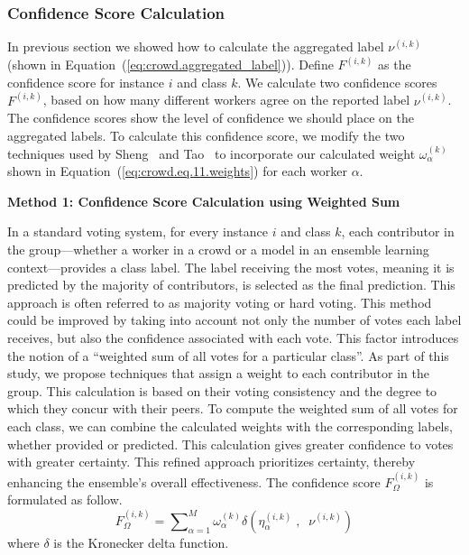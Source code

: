 \documentclass[default]{bst/sn-jnl_mine}%
\newenvironment{mymdframed}[1]{
	\begin{framed}
        \begin{center}
        \textbf{#1} \\
        \end{center}
        }
{\end{framed}}
\begin{document}
\subsubsection{Confidence Score Calculation}
In previous section we showed how to calculate the aggregated label $\nu^{(i,k)}$ (shown in Equation~(\ref{eq:crowd.aggregated_label})). Define $F^{(i,k)} $ as the confidence score for instance $i $ and class $k $. We calculate two confidence scores $F^{(i,k)} $, based on how many different workers agree on the reported label $\nu^{(i,k)}$. The confidence scores show the level of confidence we should place on the aggregated labels. To calculate this confidence score, we modify the two techniques used by Sheng~\cite{sheng_Majority_2019} and Tao~\cite{tao_Label_2020} to incorporate our calculated weight $\omega_{\alpha}^{(k)} $ shown in Equation~(\ref{eq:crowd.eq.11.weights})  for each worker $\alpha $.
\begin{mymdframed}{Method 1: Confidence Score Calculation using Weighted Sum}
    In a standard voting system, for every instance $i$ and class $k$, each contributor in the group—whether a worker in a crowd or a model in an ensemble learning context—provides a class label. The label receiving the most votes, meaning it is predicted by the majority of contributors, is selected as the final prediction. This approach is often referred to as majority voting or hard voting.
    This method could be improved by taking into account not only the number of votes each label receives, but also the confidence associated with each vote. This factor introduces the notion of a ``weighted sum of all votes for a particular class''. As part of this study, we propose techniques that assign a weight to each contributor in the group. This calculation is based on their voting consistency and the degree to which they concur with their peers.
    To compute the weighted sum of all votes for each class, we can combine the calculated weights with the corresponding labels, whether provided or predicted. This calculation gives greater confidence to votes with greater certainty. This refined approach prioritizes certainty, thereby enhancing the ensemble's overall effectiveness.
    The confidence score $F_{\Omega}^{(i,k)}$ is formulated as follow.
    \begin{equation}
        F_{\Omega}^{(i,k)} = {\sum\nolimits_{\alpha=1}^{M}{\omega_{\alpha}^{(k)} \delta\left(\eta_{\alpha}^{(i,k)} \;,\;\; \nu^{(i,k)} \right)}}
        \label{eq:crowd.Eq.13.confidence-score.Freq}
    \end{equation}
    where $\delta $ is the Kronecker delta function.
\end{mymdframed}
\end{document}
